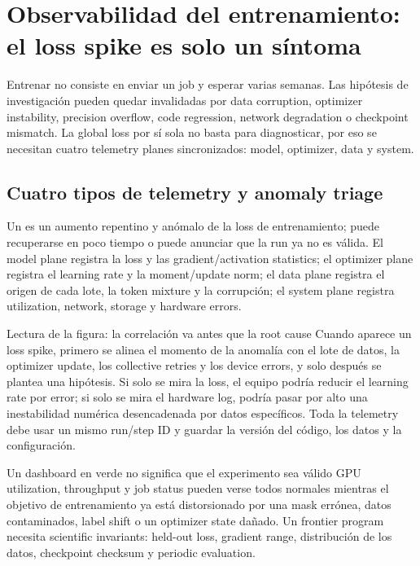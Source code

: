 \section{Observabilidad del entrenamiento: el loss spike es solo un síntoma}

Entrenar no consiste en enviar un job y esperar varias semanas. Las hipótesis de investigación pueden quedar invalidadas por data corruption, optimizer instability, precision overflow, code regression, network degradation o checkpoint mismatch. La global loss por sí sola no basta para diagnosticar, por eso se necesitan cuatro telemetry planes sincronizados: model, optimizer, data y system.

\subsection{Cuatro tipos de telemetry y anomaly triage}

Un  es un aumento repentino y anómalo de la loss de entrenamiento; puede recuperarse en poco tiempo o puede anunciar que la run ya no es válida. El model plane registra la loss y las gradient/activation statistics; el optimizer plane registra el learning rate y la moment/update norm; el data plane registra el origen de cada lote, la token mixture y la corrupción; el system plane registra utilization, network, storage y hardware errors.


\begin{knowledgebox}{Lectura de la figura: la correlación va antes que la root cause}
Cuando aparece un loss spike, primero se alinea el momento de la anomalía con el lote de datos, la optimizer update, los collective retries y los device errors, y solo después se plantea una hipótesis. Si solo se mira la loss, el equipo podría reducir el learning rate por error; si solo se mira el hardware log, podría pasar por alto una inestabilidad numérica desencadenada por datos específicos. Toda la telemetry debe usar un mismo run/step ID y guardar la versión del código, los datos y la configuración.
\end{knowledgebox}

\begin{warningbox}{Un dashboard en verde no significa que el experimento sea válido}
GPU utilization, throughput y job status pueden verse todos normales mientras el objetivo de entrenamiento ya está distorsionado por una mask errónea, datos contaminados, label shift o un optimizer state dañado. Un frontier program necesita scientific invariants: held-out loss, gradient range, distribución de los datos, checkpoint checksum y periodic evaluation.
\end{warningbox}

